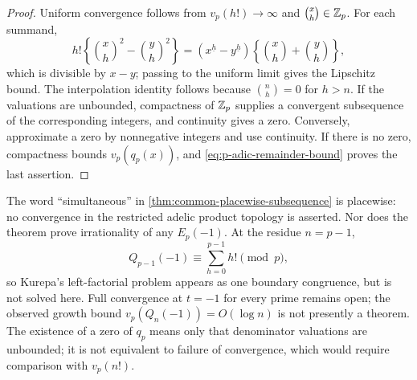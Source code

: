 \begin{proof}
Uniform convergence follows from \(v_p(h!)\to\infty\) and
\(\binom xh\in\mathbb Z_p\).  For each summand,
\[
 h!\left\{\binom xh^2-\binom yh^2\right\}
 =\left(x^{\underline h}-y^{\underline h}\right)
  \left\{\binom xh+\binom yh\right\},
\]
which is divisible by \(x-y\); passing to the uniform limit gives the
Lipschitz bound.  The interpolation identity follows because
\(\binom nh=0\) for \(h>n\).  If the valuations are unbounded, compactness
of \(\mathbb Z_p\) supplies a convergent subsequence of the corresponding integers,
and continuity gives a zero.  Conversely, approximate a zero by
nonnegative integers and use continuity.  If there is no zero, compactness
bounds \(v_p(q_p(x))\), and \eqref{eq:p-adic-remainder-bound} proves the
last assertion.
\end{proof}

The word ``simultaneous'' in \cref{thm:common-placewise-subsequence} is
placewise: no convergence in the restricted adelic product topology is
asserted.  Nor does the theorem prove irrationality of any \(E_p(-1)\).
At the residue \(n=p-1\),
\begin{equation}\label{eq:Kurepa-contact}
 Q_{p-1}(-1)\equiv\sum_{h=0}^{p-1}h!\pmod p,
\end{equation}
so Kurepa's left-factorial problem appears as one boundary congruence, but is
not solved here.  Full convergence at \(t=-1\) for every prime remains open;
the observed growth bound \(v_p(Q_n(-1))=O(\log n)\) is not presently a
theorem.  The existence of a zero of \(q_p\) means only that denominator
valuations are unbounded; it is not equivalent to failure of convergence,
which would require comparison with \(v_p(n!)\).
